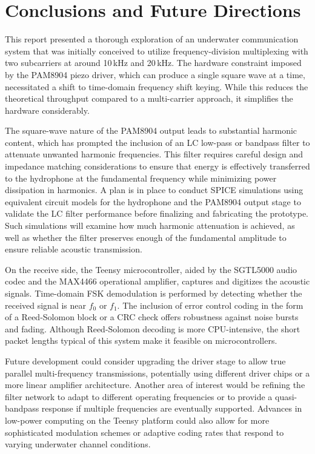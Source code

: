 \chapter{Conclusions and Future Directions}

This report presented a thorough exploration of an underwater communication system that was initially conceived to utilize frequency-division multiplexing with two subcarriers at around 10\,kHz and 20\,kHz. The hardware constraint imposed by the PAM8904 piezo driver, which can produce a single square wave at a time, necessitated a shift to time-domain frequency shift keying. While this reduces the theoretical throughput compared to a multi-carrier approach, it simplifies the hardware considerably. 

The square-wave nature of the PAM8904 output leads to substantial harmonic content, which has prompted the inclusion of an LC low-pass or bandpass filter to attenuate unwanted harmonic frequencies. This filter requires careful design and impedance matching considerations to ensure that energy is effectively transferred to the hydrophone at the fundamental frequency while minimizing power dissipation in harmonics. A plan is in place to conduct SPICE simulations using equivalent circuit models for the hydrophone and the PAM8904 output stage to validate the LC filter performance before finalizing and fabricating the prototype. Such simulations will examine how much harmonic attenuation is achieved, as well as whether the filter preserves enough of the fundamental amplitude to ensure reliable acoustic transmission.

On the receive side, the Teensy microcontroller, aided by the SGTL5000 audio codec and the MAX4466 operational amplifier, captures and digitizes the acoustic signals. Time-domain FSK demodulation is performed by detecting whether the received signal is near \(f_0\) or \(f_1\). The inclusion of error control coding in the form of a Reed-Solomon block or a CRC check offers robustness against noise bursts and fading. Although Reed-Solomon decoding is more CPU-intensive, the short packet lengths typical of this system make it feasible on microcontrollers.

Future development could consider upgrading the driver stage to allow true parallel multi-frequency transmissions, potentially using different driver chips or a more linear amplifier architecture. Another area of interest would be refining the filter network to adapt to different operating frequencies or to provide a quasi-bandpass response if multiple frequencies are eventually supported. Advances in low-power computing on the Teensy platform could also allow for more sophisticated modulation schemes or adaptive coding rates that respond to varying underwater channel conditions. 

